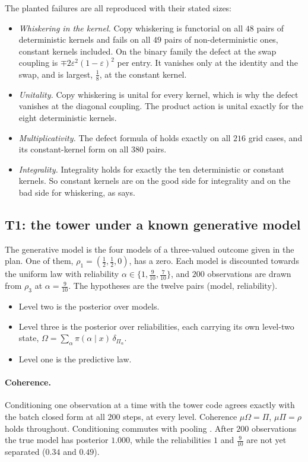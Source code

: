\documentclass[11pt]{article}
\theoremstyle{definition}
\theoremstyle{remark}
\begin{document}
The planted failures are all reproduced with their stated sizes:
\begin{itemize}[leftmargin=*,nosep]
\item \emph{Whiskering in the kernel.} Copy whiskering is functorial on all $48$ pairs of deterministic kernels and fails on all $49$
  pairs of non-deterministic ones, constant kernels included. On the binary family the defect at the swap coupling is
  $\mp2\varepsilon^2(1-\varepsilon)^2$ per entry. It vanishes only at the identity and the swap, and is largest, $\frac18$, at the constant kernel.
\item \emph{Unitality.} Copy whiskering is unital for every kernel, which is why the defect vanishes at the diagonal coupling. The product
  action is unital exactly for the eight deterministic kernels.
\item \emph{Multiplicativity.} The defect formula of \cite[Prop.~6.6]{Bands} holds exactly on all $216$ grid cases, and its
  constant-kernel form on all $380$ pairs.
\item \emph{Integrality.} Integrality holds for exactly the ten deterministic or constant kernels. So constant kernels are on the good
  side for integrality and on the bad side for whiskering, as \cite[Rem.~6.3]{Bridges} says.
\end{itemize}

\subsection{T1: the tower under a known generative model}

The generative model is the four models of a three-valued outcome given in the plan. One of them, $\rho_1=(\frac12,\frac12,0)$, has a
zero. Each model is discounted towards the uniform law with reliability $\alpha\in\{1,\frac9{10},\frac7{10}\}$, and $200$
observations are drawn from $\rho_3$ at $\alpha=\frac9{10}$. The hypotheses are the twelve pairs (model, reliability).
\begin{itemize}[leftmargin=*,nosep]
\item Level two is the posterior over models.
\item Level three is the posterior over reliabilities, each carrying its own level-two state, $\Omega=\sum_\alpha\pi(\alpha\mid
  x)\,\delta_{\Pi_\alpha}$.
\item Level one is the predictive law.
\end{itemize}

\paragraph{Coherence.} Conditioning one observation at a time with the tower code agrees exactly with the batch closed form at all $200$
steps, at every level. Coherence $\mu\Omega=\Pi$, $\mu\Pi=\rho$ holds throughout. Conditioning commutes with pooling
\cite[Prop.~9.12]{Tower}. After $200$ observations the true model has posterior $1.000$, while the reliabilities $1$ and $\frac9{10}$
are not yet separated ($0.34$ and $0.49$).
\end{document}
